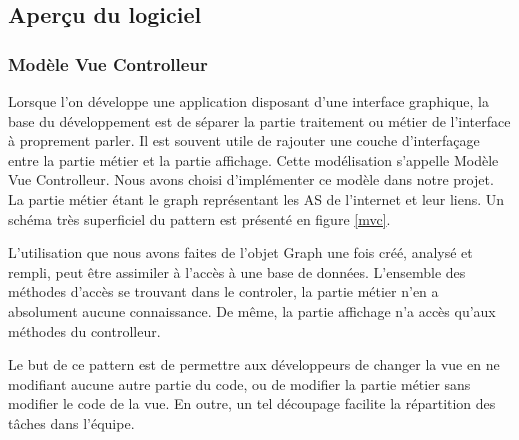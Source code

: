 \subsection{Aperçu du logiciel}
\subsubsection{Modèle Vue Controlleur}
Lorsque l'on développe une application disposant d'une interface graphique, la base du développement est de séparer la partie traitement ou métier de l'interface à proprement parler. Il est souvent utile de rajouter une couche d'interfaçage entre la partie métier et la partie affichage. Cette modélisation s'appelle Modèle Vue Controlleur. Nous avons choisi d'implémenter ce modèle dans notre projet. La partie métier étant le graph représentant les AS de l'internet et leur liens. Un schéma très superficiel du pattern est présenté en figure \ref{mvc}.

L'utilisation que nous avons faites de l'objet Graph une fois créé, analysé et rempli, peut être assimiler à l'accès à une base de données. L'ensemble des méthodes d'accès se trouvant dans le controler, la partie métier n'en a absolument aucune connaissance. De même, la partie affichage n'a accès qu'aux méthodes du controlleur.

Le but de ce pattern est de permettre aux développeurs de changer la vue en ne modifiant aucune autre partie du code, ou de modifier la partie métier sans modifier le code de la vue. En outre, un tel découpage facilite la répartition des tâches dans l'équipe.

